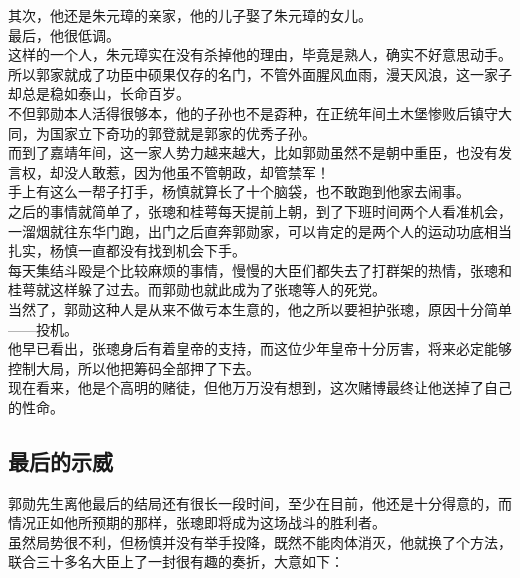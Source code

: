 \begin{multicols}{\theparacolNo}
其次，他还是朱元璋的亲家，他的儿子娶了朱元璋的女儿。\\

最后，他很低调。\\

这样的一个人，朱元璋实在没有杀掉他的理由，毕竟是熟人，确实不好意思动手。\\

所以郭家就成了功臣中硕果仅存的名门，不管外面腥风血雨，漫天风浪，这一家子却总是稳如泰山，长命百岁。\\

不但郭勋本人活得很够本，他的子孙也不是孬种，在正统年间土木堡惨败后镇守大同，为国家立下奇功的郭登就是郭家的优秀子孙。\\

而到了嘉靖年间，这一家人势力越来越大，比如郭勋虽然不是朝中重臣，也没有发言权，却没人敢惹，因为他虽不管朝政，却管禁军！\\

手上有这么一帮子打手，杨慎就算长了十个脑袋，也不敢跑到他家去闹事。\\

之后的事情就简单了，张璁和桂萼每天提前上朝，到了下班时间两个人看准机会，一溜烟就往东华门跑，出门之后直奔郭勋家，可以肯定的是两个人的运动功底相当扎实，杨慎一直都没有找到机会下手。\\

每天集结斗殴是个比较麻烦的事情，慢慢的大臣们都失去了打群架的热情，张璁和桂萼就这样躲了过去。而郭勋也就此成为了张璁等人的死党。\\

当然了，郭勋这种人是从来不做亏本生意的，他之所以要袒护张璁，原因十分简单——投机。\\

他早已看出，张璁身后有着皇帝的支持，而这位少年皇帝十分厉害，将来必定能够控制大局，所以他把筹码全部押了下去。\\

现在看来，他是个高明的赌徒，但他万万没有想到，这次赌博最终让他送掉了自己的性命。\\

\subsection{最后的示威}
郭勋先生离他最后的结局还有很长一段时间，至少在目前，他还是十分得意的，而情况正如他所预期的那样，张璁即将成为这场战斗的胜利者。\\

虽然局势很不利，但杨慎并没有举手投降，既然不能肉体消灭，他就换了个方法，联合三十多名大臣上了一封很有趣的奏折，大意如下：\\


\end{multicols}
